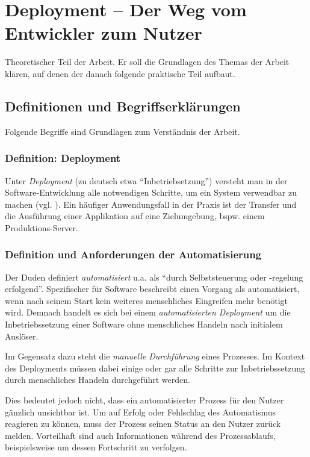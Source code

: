 \chapter{Deployment – Der Weg vom Entwickler zum Nutzer}

Theoretischer Teil der Arbeit. Er soll die Grundlagen des Themas der Arbeit klären, auf denen der danach folgende praktische Teil aufbaut.


\section{Definitionen und Begriffserklärungen}

Folgende Begriffe sind Grundlagen zum Verständnis der Arbeit.

\subsection{Definition: Deployment}

Unter \emph{Deployment} (zu deutsch etwa ``Inbetriebsetzung'') versteht man in der Software-Entwicklung alle notwendigen Schritte, um ein System verwendbar zu machen (vgl. \citep[21]{Breuer2009}). Ein häufiger Anwendungsfall in der Praxis ist der Transfer und die Ausführung einer Applikation auf eine Zielumgebung, bspw. einem Produktions-Server.

\subsection{Definition und Anforderungen der Automatisierung}

Der Duden \citeyearpar{Duden} definiert \emph{automatisiert} u.a. als ``durch Selbststeuerung oder -regelung erfolgend''. Spezifischer für Software beschreibt \citet[27]{Duvall2007} einen Vorgang als automatisiert, wenn nach seinem Start kein weiteres menschliches Eingreifen mehr benötigt wird. Demnach handelt es sich bei einem \emph{automatisierten Deployment} um die Inbetriebssetzung einer Software ohne menschliches Handeln nach initialem Auslöser.

Im Gegensatz dazu steht die \emph{manuelle Durchführung} eines Prozesses. Im Kontext des Deployments müssen dabei einige oder gar alle Schritte zur Inbetriebssetzung durch menschliches Handeln durchgeführt werden.


Dies bedeutet jedoch nicht, dass ein automatisierter Prozess für den Nutzer gänzlich unsichtbar ist. Um auf Erfolg oder Fehlschlag des Automatismus reagieren zu können, muss der Prozess seinen Status an den Nutzer zurück melden. Vorteilhaft sind auch Informationen während des Prozessablaufs, beispielsweise um dessen Fortschritt zu verfolgen. \citep[10f]{Duvall2007}

